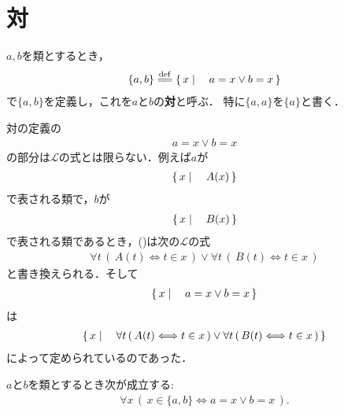 \section{対}
	\begin{screen}
		\begin{dfn}[対]
			$a,b$を類とするとき，
			\begin{align}
				\{a,b\} \defeq \Set{x}{a = x \vee b = x}
			\end{align}
			で$\{a,b\}$を定義し，これを$a$と$b$の{\bf 対}と呼ぶ．
			特に$\{a,a\}$を$\{a\}$と書く．
		\end{dfn}
	\end{screen}
	
	対の定義の
	\begin{align}
		a = x \vee b = x \label{form:definition_of_pairings}
	\end{align}
	の部分は$\mathcal{L}$の式とは限らない．例えば$a$が
	\begin{align}
		\left\{\, x \mid \quad A(x)\, \right\}
	\end{align}
	で表される類で，$b$が
	\begin{align}
		\left\{\, x \mid \quad B(x)\, \right\}
	\end{align}
	で表される類であるとき，()は次の$\mathcal{L}$の式
	\begin{align}
		\forall t\, (\, A(t) \Longleftrightarrow t \in x\, ) \vee
		\forall t\, (\, B(t) \Longleftrightarrow t \in x\, )
	\end{align}
	と書き換えられる．そして
	\begin{align}
		\left\{\, x \mid \quad a = x \vee b = x\, \right\}
	\end{align}
	は
	\begin{align}
		\left\{\, x \mid \quad \forall t\, (\, A(t) \Longleftrightarrow t \in x\, ) \vee
		\forall t\, (\, B(t) \Longleftrightarrow t \in x\, )\, \right\}
	\end{align}
	によって定められているのであった．
	
	\begin{screen}
		\begin{thm}[対は表示されている要素しか持たない]
		\label{thm:pair_members_are_exactly_the_given_two}
			$a$と$b$を類とするとき次が成立する:
			\begin{align}
				\forall x\, (\, x \in \{a,b\} \Longleftrightarrow a=x \vee b=x\, ).
			\end{align}
		\end{thm}
	\end{screen}
	
